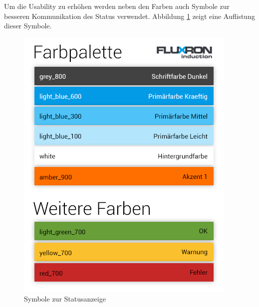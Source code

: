 Um die Usability zu erhöhen werden neben den Farben auch Symbole zur besseren Kommunikation des Status verwendet. Abbildung \ref{abb:statusSymbols} zeigt eine Auflistung dieser Symbole.
\begin{figure}[H]
    \begin{center}
        \includegraphics[trim=0 0 0 370,clip,scale=0.7]{uiux/res/basic_colors}
    \end{center}
    \caption{Symbole zur Statusanzeige}
    \label{abb:statusSymbols}
\end{figure}
